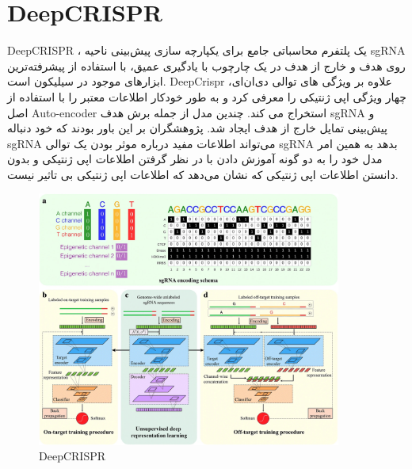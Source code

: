 \documentclass[12pt,a4paper,BCOR=.7cm,headsepline,bibliography=totoc]{report}
\begin{document}
\section{DeepCRISPR}
DeepCRISPR ، 
یک پلتفرم محاسباتی جامع برای یکپارچه سازی پیش‌بینی ناحیه‌ sgRNA روی هدف و خارج از هدف در یک چارچوب با یادگیری عمیق، با استفاده از پیشرفته‌ترین ابزارهای موجود در سیلیکون است. DeepCrispr \cite{DeepCRISPR} علاوه بر ویژگی های توالی دی‌ان‌ای، چهار ویژگی اپی ژنتیکی را معرفی کرد و به طور خودکار اطلاعات معتبر را با استفاده از اصل Auto-encoder استخراج می کند. چندین مدل از جمله برش هدف sgRNA و پیش‌بینی تمایل خارج از هدف ایجاد شد. پژوهشگران بر این باور بودند که خود دنباله sgRNA می‌تواند اطلاعات مفید درباره موثر بودن یک توالی sgRNA بدهد به همین امر مدل خود را به دو گونه آموزش دادن با در نظر گرفتن اطلاعات اپی ژنتیکی و بدون دانستن اطلاعات اپی ژنتیکی که نشان می‌دهد که اطلاعات اپی ژنتیکی بی تاثیر نیست. 
\begin{figure}[H]
\centering
\includegraphics[width=10cm, ]{pictures/DeepCRISPR.jpg}
\caption{
DeepCRISPR~\cite{DeepCRISPR}
}\label{wrap-fig:4}
\end{figure}
\end{document}
